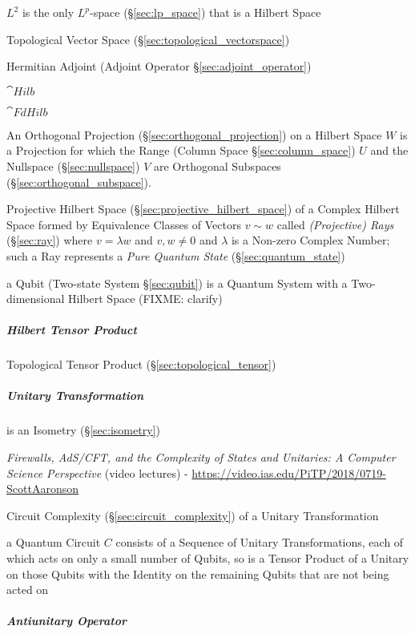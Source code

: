 $L^2$ is the only $L^p$-space (\S\ref{sec:lp_space}) that is a Hilbert Space

Topological Vector Space (\S\ref{sec:topological_vectorspace})

Hermitian Adjoint (Adjoint Operator \S\ref{sec:adjoint_operator})

$\cat{Hilb}$

$\cat{FdHilb}$

An Orthogonal Projection (\S\ref{sec:orthogonal_projection}) on a Hilbert Space
$W$ is a Projection for which the Range (Column Space \S\ref{sec:column_space})
$U$ and the Nullspace (\S\ref{sec:nullspace}) $V$ are Orthogonal Subspaces
(\S\ref{sec:orthogonal_subspace}).

\fist Projective Hilbert Space (\S\ref{sec:projective_hilbert_space}) of a
Complex Hilbert Space formed by Equivalence Classes of Vectors $v \sim w$ called
\emph{(Projective) Rays} (\S\ref{sec:ray}) where $v = \lambda w$ and $v, w \neq
0$ and $\lambda$ is a Non-zero Complex Number; such a Ray represents a
\emph{Pure Quantum State} (\S\ref{sec:quantum_state})

\fist a Qubit (Two-state System \S\ref{sec:qubit}) is a Quantum System with a
Two-dimensional Hilbert Space (FIXME: clarify)



\subparagraph{Hilbert Tensor Product}\label{sec:hilbert_tensor}\hfill

Topological Tensor Product (\S\ref{sec:topological_tensor})



\subparagraph{Unitary Transformation}\label{sec:unitary_transformation}\hfill

is an Isometry (\S\ref{sec:isometry})

\emph{Firewalls, AdS/CFT, and the Complexity of States and Unitaries: A Computer
  Science Perspective}
(video lectures)
-
\url{https://video.ias.edu/PiTP/2018/0719-ScottAaronson}

Circuit Complexity (\S\ref{sec:circuit_complexity}) of a
Unitary Transformation

a Quantum Circuit $C$ consists of a Sequence of Unitary Transformations, each of
which acts on only a small number of Qubits, so is a Tensor Product of a Unitary
on those Qubits with the Identity on the remaining Qubits that are not being
acted on



\subparagraph{Antiunitary Operator}\label{sec:antiunitary_operator}\hfill

